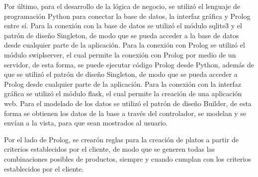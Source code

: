 Por último, para el desarrollo de la lógica de negocio, se utilizó el 
lenguaje de programación Python para conectar la base de datos, 
la interfaz gráfica y Prolog entre sí. Para la conexión con la base de 
datos se utilizó el módulo sqlite3 y el patrón de diseño Singleton, de modo 
que se pueda acceder a la base de datos desde cualquier parte de la 
aplicación. Para la conexión con Prolog se utilizó el módulo swiplserver, 
el cual permite la conexión con Prolog por medio de un servidor, de esta 
forma, se puede ejecutar código Prolog desde Python, además de que se 
utilizó el patrón de diseño Singleton, de modo que se pueda acceder a 
Prolog desde cualquier parte de la aplicación. Para la conexión con la 
interfaz gráfica se utilizó el módulo flask, el cual permite la creación 
de una aplicación web. Para el modelado de los datos se utilizó el 
patrón de diseño Builder, de esta forma se obtienen los datos de la base 
a través del controlador, se modelan y se envían a la vista, para que 
sean mostrados al usuario.

Por el lado de Prolog, se crearón reglas para la creación de platos 
a partir de criterios establecidos por el cliente, de modo que 
se generen todas las combinaciones posibles de productos, siempre y
cuando cumplan con los criterios establecidos por el cliente.
